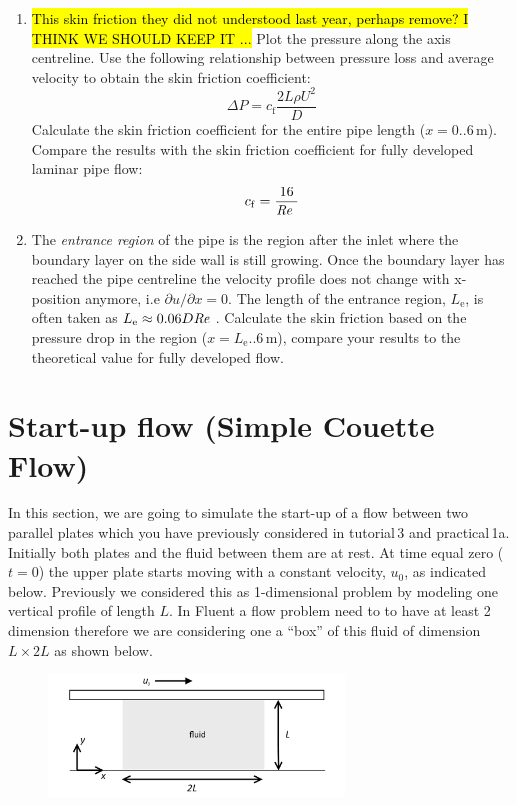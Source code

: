 \documentclass[11pt,a4paper,oneside,hidelinks]{scrartcl}
\newcommand\Rey{\mbox{\textit{Re}}\,\,}
\begin{document}
\begin{enumerate}
\item \hl{This skin friction they did not understood last year, perhaps remove? I THINK WE SHOULD KEEP IT ...} Plot the pressure along the axis centreline. Use the following relationship between pressure loss and average velocity to obtain the skin friction coefficient: 
\begin{equation}
    \Delta P=c_\mathrm{f}\frac{2L\rho U^2}{D}
\end{equation}
Calculate the skin friction coefficient for the entire pipe length ($x=0..6$\,m). Compare the results with the skin friction coefficient for fully developed laminar pipe flow:
\begin{equation}
    c_\mathrm{f}=\frac{16}{\Rey}
\end{equation}
\item The \emph{entrance region} of the pipe is the region after the inlet where the boundary layer on the side wall is still growing. Once the boundary layer has reached the pipe centreline the velocity profile does not change with x-position anymore, i.e  $\partial u/\partial x=0$. The length of the entrance region, $L_\mathrm{e}$, is often taken as $L_\mathrm{e}\approx0.06D\Rey$. Calculate the skin friction based on the pressure drop in the region ($x=L_\mathrm{e}..6$\,m), compare your results to the theoretical value for fully developed flow.
\end{enumerate}

\section{Start-up flow (Simple Couette Flow)}

In this section, we are going to simulate the start-up of a flow between two parallel plates which you have previously considered in tutorial\,3 and practical\,1a. Initially both plates and the fluid between them are at rest. At time equal zero ($t=0$) the upper plate starts moving with a constant velocity, $u_0$, as indicated below. Previously we considered this as 1-dimensional problem by modeling one vertical profile of length $L$. In Fluent a flow problem need to to have at least 2 dimension therefore we are considering one a ``box'' of this fluid of dimension $L\times 2L$ as shown below.

\begin{figure}[H]
\begin{center}
\includegraphics[width=0.7\textwidth,clip]{start_up_flow.png}
\end{center}
\end{figure}
\end{document}
